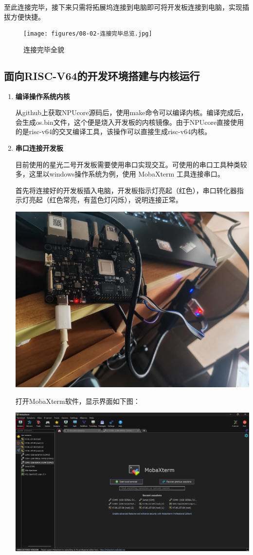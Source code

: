 至此连接完毕，接下来只需将拓展坞连接到电脑即可将开发板连接到电脑，实现插拔方便快捷。

\begin{figure}[htb]
	\centering
	\texttt{[image: figures/08-02-连接完毕总览.jpg]}
	\caption{
		连接完毕全貌
	}
	\label{fig:pipe}
\end{figure}


\subsection{面向RISC-V64的开发环境搭建与内核运行}
{
\begin{enumerate}
	\item \textbf{编译操作系统内核}
	
	从github上获取NPUcore源码后，使用make命令可以编译内核。编译完成后，会生成os.bin文件，这个便是烧入开发板的内核镜像。由于NPUcore直接使用的是risc-v64的交叉编译工具，该操作可以直接生成risc-v64内核。
	
	\item \textbf{串口连接开发板}
	
	目前使用的星光二号开发板需要使用串口实现交互。可使用的串口工具种类较多，这里以windows操作系统为例，使用
	MobaXterm 工具连接串口。
	
	首先将连接好的开发板插入电脑，开发板指示灯亮起（红色），串口转化器指示灯亮起（红色常亮，有蓝色灯闪烁），说明连接正常。
	~~
	
	\centering
	\includegraphics[width=0.58\linewidth]{figures/08-02-星光二号线路.jpg}
	\raggedright
	
	
	打开MobaXterm软件，显示界面如下图：
	
	\centering
	\includegraphics[width=0.58\linewidth]{figures/08-02-MobaXterm界面.jpg}
	\raggedright
	

\end{enumerate}}
